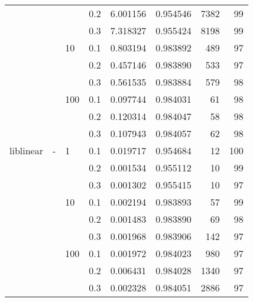 \begin{table}[H]
\begin{tabular}{llllrrrr}
          &   &     & 0.2 &   6.001156 &  0.954546 &    7382 &    99 \\
          &   &     & 0.3 &   7.318327 &  0.955424 &    8198 &    99 \\
          &   & 10  & 0.1 &   0.803194 &  0.983892 &     489 &    97 \\
          &   &     & 0.2 &   0.457146 &  0.983890 &     533 &    97 \\
          &   &     & 0.3 &   0.561535 &  0.983884 &     579 &    98 \\
          &   & 100 & 0.1 &   0.097744 &  0.984031 &      61 &    98 \\
          &   &     & 0.2 &   0.120314 &  0.984047 &      58 &    98 \\
          &   &     & 0.3 &   0.107943 &  0.984057 &      62 &    98 \\
liblinear & - & 1   & 0.1 &   0.019717 &  0.954684 &      12 &   100 \\
          &   &     & 0.2 &   0.001534 &  0.955112 &      10 &    99 \\
          &   &     & 0.3 &   0.001302 &  0.955415 &      10 &    97 \\
          &   & 10  & 0.1 &   0.002194 &  0.983893 &      57 &    99 \\
          &   &     & 0.2 &   0.001483 &  0.983890 &      69 &    98 \\
          &   &     & 0.3 &   0.001968 &  0.983906 &     142 &    97 \\
          &   & 100 & 0.1 &   0.001972 &  0.984023 &     980 &    97 \\
          &   &     & 0.2 &   0.006431 &  0.984028 &    1340 &    97 \\
          &   &     & 0.3 &   0.002328 &  0.984051 &    2886 &    97 \\
\bottomrule
\end{tabular}
\end{table}
